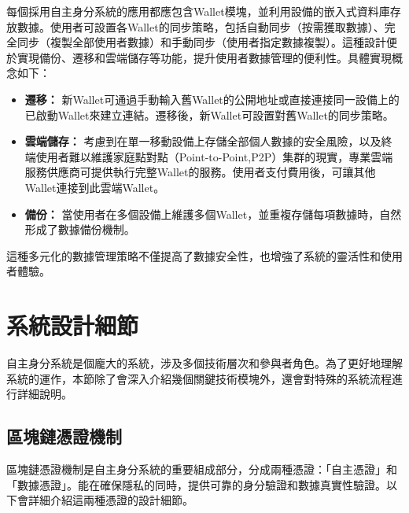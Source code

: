 每個採用自主身分系統的應用都應包含Wallet模塊，並利用設備的嵌入式資料庫存放數據。使用者可設置各Wallet的同步策略，包括自動同步（按需獲取數據）、完全同步（複製全部使用者數據）和手動同步（使用者指定數據複製）。這種設計便於實現備份、遷移和雲端儲存等功能，提升使用者數據管理的便利性。具體實現概念如下：
\begin{itemize}
  \item \textbf{遷移：} 新Wallet可通過手動輸入舊Wallet的公開地址或直接連接同一設備上的已啟動Wallet來建立連結。遷移後，新Wallet可設置對舊Wallet的同步策略。
  \item \textbf{雲端儲存：} 考慮到在單一移動設備上存儲全部個人數據的安全風險，以及終端使用者難以維護家庭點對點（Point-to-Point,P2P）集群的現實，專業雲端服務供應商可提供執行完整Wallet的服務。使用者支付費用後，可讓其他 Wallet連接到此雲端Wallet。
  \item \textbf{備份：} 當使用者在多個設備上維護多個Wallet，並重複存儲每項數據時，自然形成了數據備份機制。
\end{itemize}
這種多元化的數據管理策略不僅提高了數據安全性，也增強了系統的靈活性和使用者體驗。
\section{系統設計細節}
自主身分系統是個龐大的系統，涉及多個技術層次和參與者角色。為了更好地理解系統的運作，本節除了會深入介紹幾個關鍵技術模塊外，還會對特殊的系統流程進行詳細說明。
\subsection{區塊鏈憑證機制}
區塊鏈憑證機制是自主身分系統的重要組成部分，分成兩種憑證：「自主憑證」和「數據憑證」。能在確保隱私的同時，提供可靠的身分驗證和數據真實性驗證。以下會詳細介紹這兩種憑證的設計細節。
